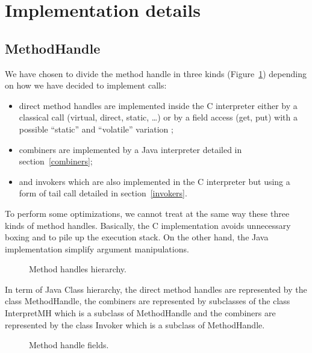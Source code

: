 \documentclass{sig-alternate}
\begin{document}
\section{Implementation details}
\label{implD}

    \subsection{MethodHandle}
      We have chosen to divide the method handle in three kinds (Figure~\ref{mhHier})
      depending on how we have decided to implement calls:
      \begin{itemize}
        \item direct method handles are implemented inside the C interpreter
              either by a classical call (virtual, direct, static, \dots)
              or by a field access (get, put) with a possible ``static'' and ``volatile'' variation ;
        \item combiners are implemented by a Java interpreter detailed in section~\ref{combiners};
        \item and invokers which are also implemented in the C interpreter but using a form of tail call
              detailed in section~\ref{invokers}.
      \end{itemize}

      To perform some optimizations, we cannot treat at the same way these three kinds of method handles.
      Basically, the C implementation avoids unnecessary boxing and to pile up the execution stack.
      On the other hand, the Java implementation simplify argument manipulations.

      \begin{figure}[!ht]
        \centering \resizebox{\linewidth}{!}{}
        \caption{Method handles hierarchy.}
        \label{mhHier}
      \end{figure}

      In term of Java Class hierarchy, the direct method handles are represented by the class MethodHandle,
      the combiners are represented by subclasses of the class InterpretMH which is a subclass of MethodHandle
      and the combiners are represented by the class Invoker which is a subclass of MethodHandle.

      \begin{figure}[!ht]
        \centering \vspace{-1.5em}
        \caption{Method handle fields.}
        \label{mhFields}
      \end{figure}
\end{document}
